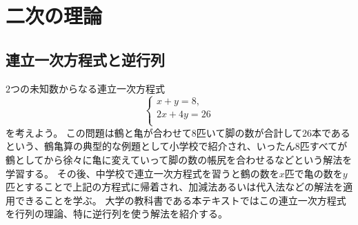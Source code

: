 
\chapter{二次の理論}

\section{連立一次方程式と逆行列}

$2$つの未知数からなる連立一次方程式
$$
\begin{cases}
x+y = 8, \\
2 x+4 y = 26 \\
\end{cases}
$$
を考えよう。
この問題は鶴と亀が合わせて$8$匹いて脚の数が合計して$26$本であるという、鶴亀算の典型的な例題として小学校で紹介され、いったん$8$匹すべてが鶴としてから徐々に亀に変えていって脚の数の帳尻を合わせるなどという解法を学習する。
その後、中学校で連立一次方程式を習うと鶴の数を$x$匹で亀の数を$y$匹とすることで上記の方程式に帰着され、加減法あるいは代入法などの解法を適用できることを学ぶ。
大学の教科書である本テキストではこの連立一次方程式を行列の理論、特に逆行列を使う解法を紹介する。

